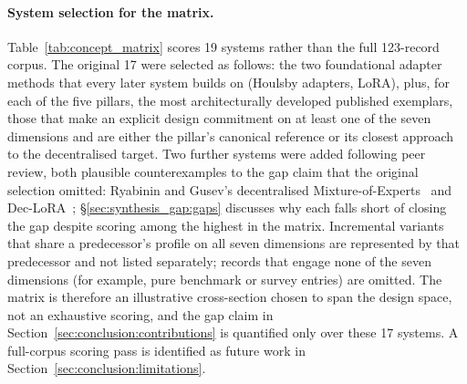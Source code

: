 \paragraph{System selection for the matrix.}
Table~\ref{tab:concept_matrix} scores 19 systems rather than the full 123-record
corpus. The original 17 were selected as follows: the two foundational adapter methods
that every later system builds on (Houlsby adapters, LoRA), plus, for each of
the five pillars, the most architecturally developed published exemplars,
those that make an explicit design commitment on at least one of the seven
dimensions and are either the pillar's canonical reference or its closest
approach to the decentralised target. Two further systems were added
following peer review, both plausible counterexamples to the gap claim
that the original selection omitted: Ryabinin and Gusev's decentralised
Mixture-of-Experts~\cite{RyabininCrowdsourced2020} and
Dec-LoRA~\cite{Ghiasvand2025}; \S\ref{sec:synthesis_gap:gaps} discusses
why each falls short of closing the gap despite scoring among the highest
in the matrix. Incremental variants that share a
predecessor's profile on all seven dimensions are represented by that
predecessor and not listed separately; records that engage none of the seven
dimensions (for example, pure benchmark or survey entries) are omitted. The
matrix is therefore an illustrative cross-section chosen to span the design
space, not an exhaustive scoring, and the gap claim in
Section~\ref{sec:conclusion:contributions} is quantified only over these 17
systems. A full-corpus scoring pass is identified as future work in
Section~\ref{sec:conclusion:limitations}.


